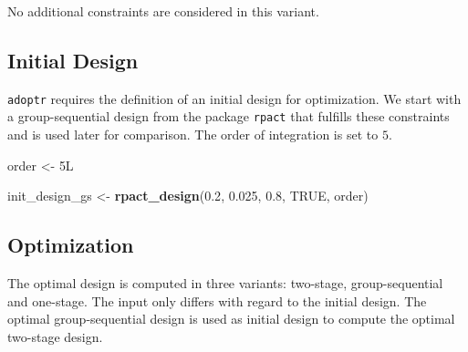 \documentclass[]{book}
\newenvironment{Shaded}{\begin{snugshade}}{\end{snugshade}}
\newcommand{\ControlFlowTok}[1]{\textcolor[rgb]{0.13,0.29,0.53}{\textbf{#1}}}
\newcommand{\DataTypeTok}[1]{\textcolor[rgb]{0.13,0.29,0.53}{#1}}
\newcommand{\DecValTok}[1]{\textcolor[rgb]{0.00,0.00,0.81}{#1}}
\newcommand{\FloatTok}[1]{\textcolor[rgb]{0.00,0.00,0.81}{#1}}
\newcommand{\KeywordTok}[1]{\textcolor[rgb]{0.13,0.29,0.53}{\textbf{#1}}}
\newcommand{\NormalTok}[1]{#1}
\newcommand{\OperatorTok}[1]{\textcolor[rgb]{0.81,0.36,0.00}{\textbf{#1}}}
\newcommand{\OtherTok}[1]{\textcolor[rgb]{0.56,0.35,0.01}{#1}}
\newcommand{\StringTok}[1]{\textcolor[rgb]{0.31,0.60,0.02}{#1}}
\begin{document}
No additional constraints are considered in this variant.

\hypertarget{initial-design-5}{%
\subsection{Initial Design}\label{initial-design-5}}

\texttt{adoptr} requires the definition of an initial design for optimization.
We start with a group-sequential design from the package \texttt{rpact} that
fulfills these constraints and is used later for comparison.
The order of integration is set to \(5\).

\begin{Shaded}
\begin{Highlighting}[]
\NormalTok{order <-}\StringTok{ }\NormalTok{5L }

\NormalTok{init_design_gs <-}\StringTok{ }\KeywordTok{rpact_design}\NormalTok{(}\FloatTok{0.2}\NormalTok{, }\FloatTok{0.025}\NormalTok{, }\FloatTok{0.8}\NormalTok{, }\OtherTok{TRUE}\NormalTok{, order)}
\end{Highlighting}
\end{Shaded}

\hypertarget{optimization-6}{%
\subsection{Optimization}\label{optimization-6}}

The optimal design is computed in three variants: two-stage, group-sequential
and one-stage.
The input only differs with regard to the initial design.
The optimal group-sequential design is used as initial design to
compute the optimal two-stage design.

\begin{Shaded}
\end{Shaded}
\end{document}
